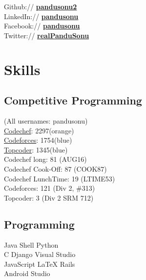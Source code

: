 \documentclass[letterpaper]{deedy-resume} %
\begin{document}
\begin{minipage}[t]{0.33\textwidth}
Github:// \href{https://github.com/pandusonu2}{\bf pandusonu2} \\
LinkedIn:// \href{https://www.linkedin.com/in/pandusonu}{\bf pandusonu} \\
Facebook:// \href{https://www.facebook.com/pandu.sonu}{\bf pandusonu} \\
Twitter:// \href{https://twitter.com/pandu_sonu} {\bf realPanduSonu}

\sectionspace %

\section{Skills}

\sectionspace

\subsection{Competitive Programming}
(All usernames: pandusonu) \\
\href{https://www.codechef.com/users/pandusonu}{Codechef}: 2297(orange)\\
\href{http://codeforces.com/profile/pandusonu}{Codeforces}: 1754(blue) \\
\href{https://www.topcoder.com/members/pandusonu/}{Topcoder}: 1345(blue)\\
Codechef long: 81 (AUG16)\\
Codechef Cook-Off: 87 (COOK87)\\
Codechef LunchTime: 19 (LTIME53)\\
Codeforces: 121 (Div 2, \#313)\\
Topcoder: 3 (Div 2 SRM 712)

\sectionspace

\subsection{Programming}

Java \textbullet{} Shell \textbullet{} Python \textbullet{} \\
C \textbullet{} Django \textbullet{} Visual Studio \\

JavaScript \textbullet{} \LaTeX \textbullet{} Rails \textbullet{} \\
Android Studio




\end{minipage} %
\end{document}
